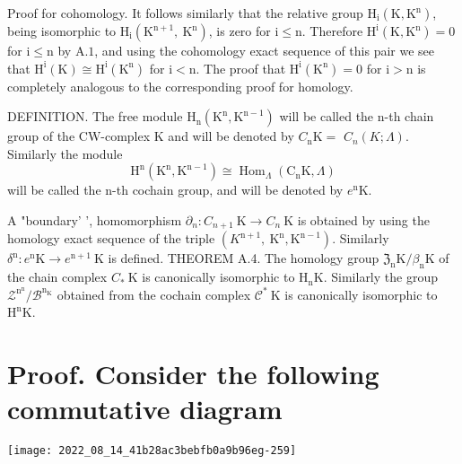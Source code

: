 \documentclass[10pt]{article}
\begin{document}
Proof for cohomology. It follows similarly that the relative group $\mathrm{H}_{\mathrm{i}}\left(\mathrm{K}, \mathrm{K}^{\mathrm{n}}\right)$, being isomorphic to $\mathrm{H}_{\mathrm{i}}\left(\mathrm{K}^{\mathrm{n}+1}, \mathrm{~K}^{\mathrm{n}}\right)$, is zero for $\mathrm{i} \leq \mathrm{n}$. Therefore $\mathrm{H}^{\mathrm{i}}\left(\mathrm{K}, \mathrm{K}^{\mathrm{n}}\right)=0$ for $\mathrm{i} \leq \mathrm{n}$ by $\mathrm{A} .1$, and using the cohomology exact sequence of this pair we see that $\mathrm{H}^{\mathrm{i}}(\mathrm{K}) \cong \mathrm{H}^{\mathrm{i}}\left(\mathrm{K}^{\mathrm{n}}\right)$ for $\mathrm{i}<\mathrm{n}$. The proof that $\mathrm{H}^{\mathrm{i}}\left(\mathrm{K}^{\mathrm{n}}\right)=0$ for $\mathrm{i}>\mathrm{n}$ is completely analogous to the corresponding proof for homology.

DEFINITION. The free module $\mathrm{H}_{\mathrm{n}}\left(\mathrm{K}^{\mathrm{n}}, \mathrm{K}^{\mathrm{n}-1}\right)$ will be called the $\mathrm{n}$-th chain group of the $\mathrm{CW}$-complex $\mathrm{K}$ and will be denoted by $C_{\mathrm{n}} \mathrm{K}=$ $C_{n}(K ; \Lambda)$. Similarly the module
$$
\mathrm{H}^{\mathrm{n}}\left(\mathrm{K}^{\mathrm{n}}, \mathrm{K}^{\mathrm{n}-1}\right) \cong \operatorname{Hom}_{\Lambda}\left(\mathrm{C}_{\mathrm{n}} \mathrm{K}, \Lambda\right)
$$
will be called the $\mathrm{n}$-th cochain group, and will be denoted by $e^{\mathrm{n}} \mathrm{K}$.

A "boundary' ', homomorphism $\partial_{n}: C_{n+1} \mathrm{~K} \rightarrow C_{n} \mathrm{~K}$ is obtained by using the homology exact sequence of the triple $\left(K^{\mathrm{n}+1}, \mathrm{~K}^{\mathrm{n}}, \mathrm{K}^{\mathrm{n}-1}\right)$. Similarly $\delta^{\mathrm{n}}: e^{\mathrm{n}} \mathrm{K} \rightarrow e^{\mathrm{n}+1} \mathrm{~K}$ is defined. THEOREM A.4. The homology group $\mathfrak{Z}_{\mathrm{n}} \mathrm{K} / \beta_{\mathrm{n}} \mathrm{K}$ of the chain complex $C_{*} \mathrm{~K}$ is canonically isomorphic to $\mathrm{H}_{\mathrm{n}} \mathrm{K}$. Similarly the group $\mathcal{Z}^{\mathrm{n}^{\mathrm{n}}} / \mathcal{B}^{\mathrm{n}_{\mathrm{K}}}$ obtained from the cochain complex $\mathcal{C}^{*} \mathrm{~K}$ is canonically isomorphic to $\mathrm{H}^{\mathrm{n}} \mathrm{K}$.

\section{Proof. Consider the following commutative diagram}
\texttt{[image: 2022\_08\_14\_41b28ac3bebfb0a9b96eg-259]}
\end{document}
